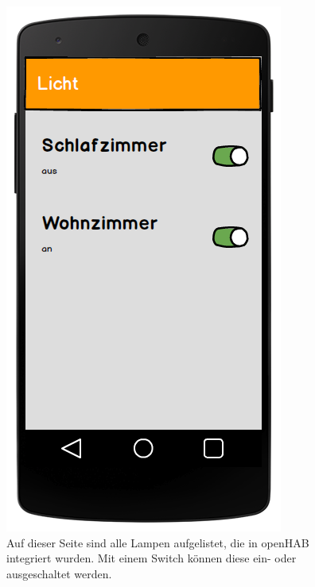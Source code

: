 \begin{figure}[H]
	\centering
		\includegraphics[scale=0.3]{report/img/mockup_light.png}
	\caption{Auf dieser Seite sind alle Lampen aufgelistet, die in openHAB integriert wurden. Mit einem Switch können diese ein- oder ausgeschaltet werden.}
	\label{fig:mockupLight}
\end{figure}

